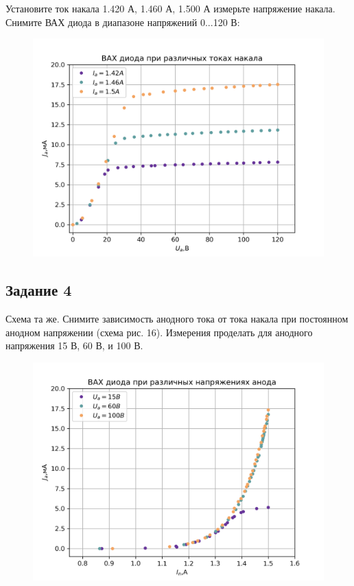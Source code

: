 Установите ток накала 1.420 А, 1.460 А, 1.500 А измерьте напряжение накала. Снимите ВАХ диода в диапазоне напряжений 0...120 В:

\begin{figure}[H]
	\centering
	\includegraphics[width=0.85\linewidth]{scripts/z3.png}
	\caption{}
	\label{fig:17}
\end{figure}

\subsection{Задание 4}
Схема та же. Снимите зависимость анодного тока от тока накала при постоянном анодном напряжении (схема рис. 16). Измерения проделать для анодного напряжения 15 В, 60 В, и 100 В.

\begin{figure}[H]
	\centering
	\includegraphics[width=0.85\linewidth]{scripts/z3123.png}
	\caption{}
	\label{fig:18}
\end{figure}

